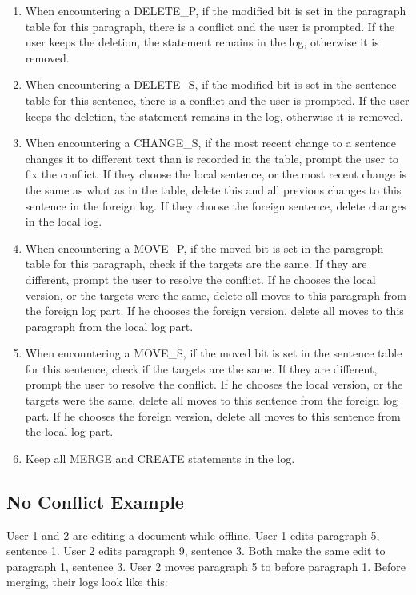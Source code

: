 \begin{enumerate}[1)]

\item When encountering a DELETE\_P, if the modified bit is set in the paragraph table for this paragraph,
      there is a conflict and the user is prompted. If the user keeps the deletion, the
      statement remains in the log, otherwise it is removed.

\item When encountering a DELETE\_S, if the modified bit is set in the sentence table for this sentence,
      there is a conflict and the user is prompted. If the user keeps the deletion, the
      statement remains in the log, otherwise it is removed.

\item When encountering a CHANGE\_S, if the most recent change to a sentence changes it to different text
      than is recorded in the table, prompt the user to fix the conflict. If they choose the local sentence,
      or the most recent change is the same as what as in the table, delete this and all previous changes
      to this sentence in the foreign log. If they choose the foreign sentence, delete changes in the 
      local log.

\item When encountering a MOVE\_P, if the moved bit is set in the paragraph table for this paragraph,
      check if the targets are the same. If they are different, prompt the
      user to resolve the conflict. If he chooses the local version, or the targets were the same, 
      delete all moves to this paragraph
      from the foreign log part. If he chooses the foreign version, delete all moves to this paragraph
      from the local log part.

\item When encountering a MOVE\_S, if the moved bit is set in the sentence table for this sentence,
      check if the targets are the same. If they are different, prompt the
      user to resolve the conflict. If he chooses the local version, or the targets were the same, 
      delete all moves to this sentence 
      from the foreign log part. If he chooses the foreign version, delete all moves to this sentence 
      from the local log part.

\item Keep all MERGE and CREATE statements in the log.
\end{enumerate}

\subsection{No Conflict Example}
User 1 and 2 are editing a document while offline. User 1 edits paragraph 5, sentence 1. User 2 edits
paragraph 9, sentence 3. Both make the same edit to paragraph 1, sentence 3. User 2 moves paragraph 5
to before paragraph 1. Before merging, their logs look like this:

